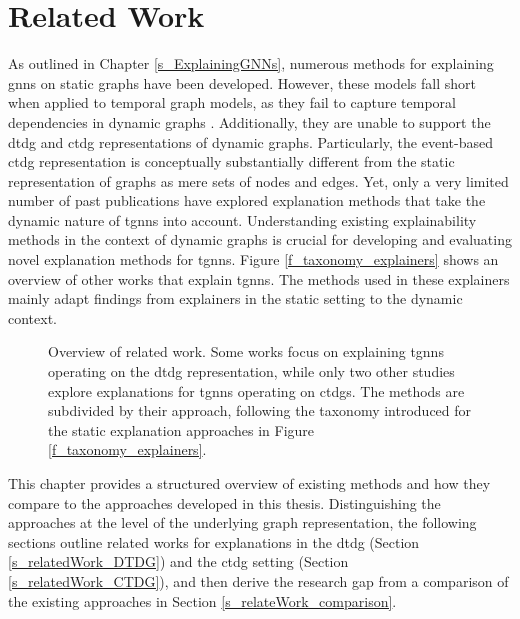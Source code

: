 \section{Related Work}
\label{s_RelatedWork}


As outlined in Chapter \ref{s_ExplainingGNNs}, numerous methods for explaining \glspl{gnn} on static graphs have been developed. However, these models fall short when applied to temporal graph models, as they fail to capture temporal dependencies in dynamic graphs \cite{xia_explaining_2023, he_explainer_2022}. Additionally, they are unable to support the \gls{dtdg} and \gls{ctdg} representations of dynamic graphs. Particularly, the event-based \gls{ctdg} representation is conceptually substantially different from the static representation of graphs as mere sets of nodes and edges. Yet, only a very limited number of past publications have explored explanation methods that take the dynamic nature of \glspl{tgnn} into account. Understanding existing explainability methods in the context of dynamic graphs is crucial for developing and evaluating novel explanation methods for \glspl{tgnn}. Figure \ref{f_taxonomy_explainers} shows an overview of other works that explain \glspl{tgnn}. The methods used in these explainers mainly adapt findings from explainers in the static setting to the dynamic context. 

\begin{figure}[ht]
    \centering
    
    \label{f_relatedWork_taxonomy}
    \caption{Overview of related work. Some works focus on explaining \glspl{tgnn} operating on the \gls{dtdg} representation, while only two other studies explore explanations for \glspl{tgnn} operating on \glspl{ctdg}. The methods are subdivided by their approach, following the taxonomy introduced for the static explanation approaches in Figure \ref{f_taxonomy_explainers}.}
\end{figure}

This chapter provides a structured overview of existing methods and how they compare to the approaches developed in this thesis. Distinguishing the approaches at the level of the underlying graph representation, the following sections outline related works for explanations in the \gls{dtdg} (Section \ref{s_relatedWork_DTDG}) and the \gls{ctdg} setting (Section \ref{s_relatedWork_CTDG}), and then derive the research gap from a comparison of the existing approaches in Section \ref{s_relateWork_comparison}.

